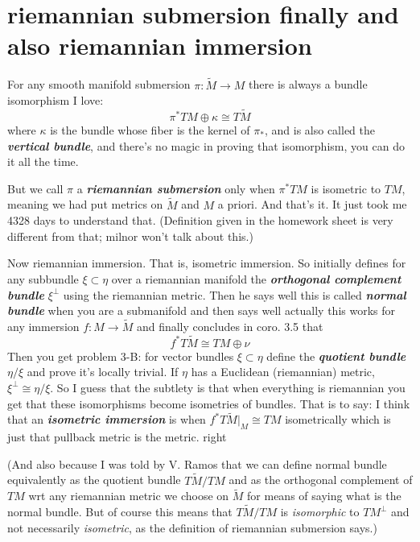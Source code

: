 \section{riemannian submersion finally and also riemannian immersion}

For any smooth manifold submersion \(\pi:\widetilde{M}\to M\) there is always a bundle isomorphism I love:
\[\pi^*TM \oplus \kappa\cong T\widetilde{M}\]
where \(\kappa\) is the bundle whose fiber is the kernel of \(\pi_*\), and is also called the \textit{\textbf{vertical bundle}}, and there's no magic in proving that isomorphism, you can do it all the time.

 But we call \(\pi\) a \textit{\textbf{riemannian submersion}} only when \(\pi^*TM\) is isometric to \(TM\), meaning we had put metrics on \(\widetilde{M}\) and \(M\) a priori. And that's it. It just took me 4328 days to understand that. (Definition given in the homework sheet is very different from that; milnor won't talk about this.)

Now riemannian immersion. That is, isometric immersion. So initially \cite{mc} defines for any subbundle \(\xi \subset \eta\) over a riemannian manifold the  \textit{\textbf{orthogonal complement bundle}} \(\xi^\perp\) using the riemannian metric. Then he says well this is called \textit{\textbf{normal bundle}} when you are a submanifold and then says well actually this works for any immersion \(f:M \to \widetilde{M}\) and finally concludes in coro. 3.5 that
\[f^*T\widetilde{M} \cong TM \oplus  \nu\]
Then you get problem 3-B: for vector bundles \(\xi \subset \eta\) define the \textit{\textbf{quotient bundle}} \(\eta/\xi\) and prove it's locally trivial. If \(\eta\) has a Euclidean (riemannian) metric, \(\xi^\perp \cong \eta/\xi\). So I guess that the subtlety is that when everything is riemannian you get that these isomorphisms become isometries of bundles. That is to say: I think that an \textit{\textbf{isometric immersion}} is when \(f^* T \widetilde{M}|_{M}\cong TM\) isometrically which is just that pullback metric is the metric. right

(And also because I was told by V. Ramos that we can define normal bundle equivalently as the quotient bundle \(T\widetilde{M}/TM\) and as the orthogonal complement of \(TM\) wrt any riemannian metric we choose on \(\widetilde{M}\) for means of saying what is the normal bundle. But of course this means that \(T\widetilde{M}/TM\) is \textit{isomorphic} to \(TM^\perp\) and not necessarily \textit{isometric}, as the definition of riemannian submersion says.)

